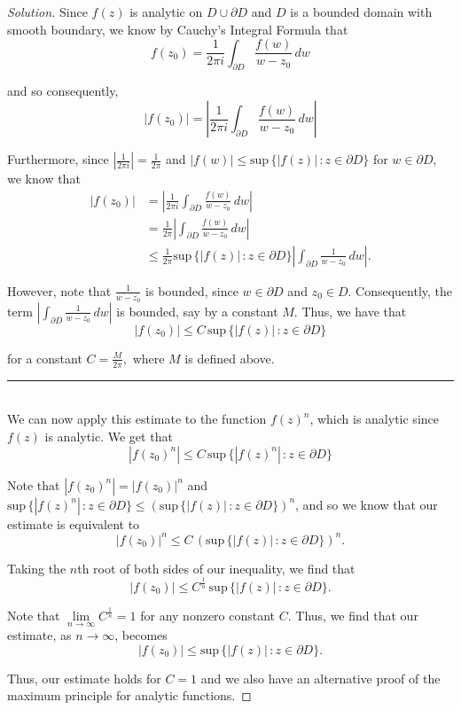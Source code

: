 \documentclass[11pt]{article}
\newenvironment{solution}
  {\renewcommand\qedsymbol{$\blacksquare$}\begin{proof}[Solution]}
  {\end{proof}}
\theoremstyle{definition}
\begin{document}
\begin{solution}
Since $f(z)$ is analytic on $D \cup \partial D$ and $D$ is a bounded domain with smooth boundary, we know by Cauchy's Integral Formula that
\[ f(z_0) = \frac{1}{2\pi i} \int_{\partial D} \frac{f(w)}{w-z_0} \, dw\]

and so consequently, 
\[ |f(z_0)| = \left|\frac{1}{2\pi i} \int_{\partial D} \frac{f(w)}{w-z_0} \, dw \right| \]

Furthermore, since $\left| \frac{1}{2\pi i} \right| = \frac{1}{2\pi}$ and $|f(w)| \leq \mathrm{sup} \, \{|f(z)| \, : z \in \partial D\}$ for $w \in \partial D$, we know that
\begin{align*} |f(z_0)| &= \left|\frac{1}{2\pi i} \int_{\partial D} \frac{f(w)}{w-z_0} \, dw \right| \\
&= \frac{1}{2\pi} \left|\int_{\partial D} \frac{f(w)}{w-z_0} \, dw \right| \\
&\leq \frac{1}{2\pi} \mathrm{sup} \, \{|f(z)| \, : z \in \partial D\} \left|\int_{\partial D} \frac{1}{w-z_0} \, dw \right|. \end{align*}

However, note that $\frac{1}{w-z_0}$ is bounded, since $w \in \partial D$ and $z_0 \in D$. Consequently, the term $\left|\int_{\partial D} \frac{1}{w-z_0} \, dw \right|$ is bounded, say by a constant $M$. 
Thus, we have that
\[ |f(z_0)| \leq C \, \mathrm{sup} \, \{|f(z)| \, : z \in \partial D\} \]

for a constant $C = \frac{M}{2\pi},$ where $M$ is defined above. \\

\noindent\rule{\textwidth}{1pt} \\

We can now apply this estimate to the function $f(z)^n$, which is analytic since $f(z)$ is analytic. We get that
\[ |f(z_0)^n| \leq C \, \mathrm{sup} \, \{|f(z)^n| \, : z \in \partial D\} \]

Note that $|f(z_0)^n| = |f(z_0)|^n$ and $\mathrm{sup} \, \{|f(z)^n| \, : z \in \partial D\} \leq \left(\mathrm{sup} \, \{|f(z)| \, : z \in \partial D\}\right)^n$, and so we know that
our estimate is equivalent to
\[ |f(z_0)|^n \leq C \, \left(\mathrm{sup} \, \{|f(z)| \, : z \in \partial D\} \right)^n.\]

Taking the $n$th root of both sides of our inequality, we find that
\[ |f(z_0)| \leq C^{\frac{1}{n}} \, \mathrm{sup} \, \{|f(z)| \, : z \in \partial D\}. \]

Note that $\lim\limits_{n \rightarrow \infty} C^{\frac{1}{n}} = 1$ for any nonzero constant $C$. Thus, we find that our estimate, as $n \rightarrow \infty$, becomes
\[|f(z_0)| \leq  \mathrm{sup} \, \{|f(z)| \, : z \in \partial D\}.\]

Thus, our estimate holds for $C=1$ and we also have an alternative proof of the maximum principle for analytic functions.
\end{solution}
\end{document}
